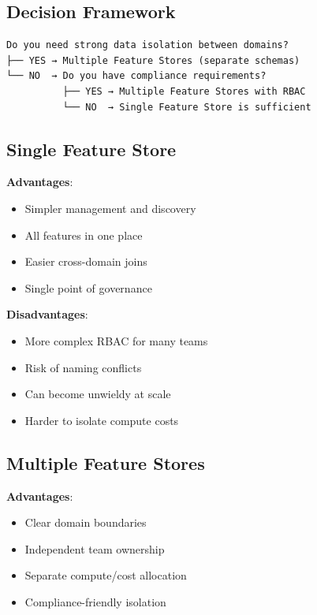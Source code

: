 \documentclass[
  letterpaper,
  DIV=11,
  numbers=noendperiod]{scrreprt}
\providecommand{\tightlist}{%
  \setlength{\itemsep}{0pt}\setlength{\parskip}{0pt}}\usepackage{longtable,booktabs,array}
\begin{document}
\hypertarget{decision-framework}{%
\subsection{Decision Framework}\label{decision-framework}}

\begin{verbatim}
Do you need strong data isolation between domains?
├── YES → Multiple Feature Stores (separate schemas)
└── NO  → Do you have compliance requirements?
          ├── YES → Multiple Feature Stores with RBAC
          └── NO  → Single Feature Store is sufficient
\end{verbatim}

\hypertarget{single-feature-store}{%
\subsection{Single Feature Store}\label{single-feature-store}}

\textbf{Advantages}:

\begin{itemize}
\tightlist
\item
  Simpler management and discovery
\item
  All features in one place
\item
  Easier cross-domain joins
\item
  Single point of governance
\end{itemize}

\textbf{Disadvantages}:

\begin{itemize}
\tightlist
\item
  More complex RBAC for many teams
\item
  Risk of naming conflicts
\item
  Can become unwieldy at scale
\item
  Harder to isolate compute costs
\end{itemize}

\hypertarget{multiple-feature-stores}{%
\subsection{Multiple Feature Stores}\label{multiple-feature-stores}}

\textbf{Advantages}:

\begin{itemize}
\tightlist
\item
  Clear domain boundaries
\item
  Independent team ownership
\item
  Separate compute/cost allocation
\item
  Compliance-friendly isolation
\end{itemize}
\end{document}
